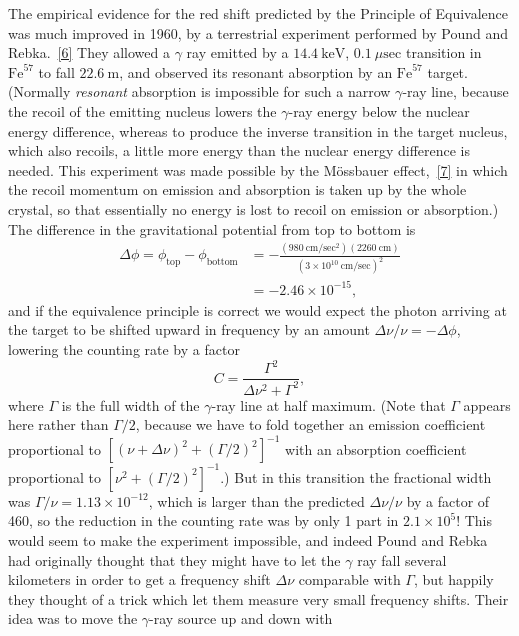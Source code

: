 The empirical evidence for the red shift predicted by the Principle of
Equivalence was much improved in 1960, by a terrestrial experiment performed
by Pound and Rebka.~\hyperref[ch3-ref-6]{[6]} They allowed a $\gamma$ ray
emitted by a $14.4\ \mathrm{keV}$, $0.1\ \mu\mathrm{sec}$ transition in
$\mathrm{Fe}^{57}$ to fall $22.6\ \mathrm m$, and observed its resonant
absorption by an $\mathrm{Fe}^{57}$ target. (Normally \emph{resonant}
absorption is impossible for such a narrow $\gamma$-ray line, because the
recoil of the emitting nucleus lowers the $\gamma$-ray energy below the
nuclear energy difference, whereas to produce the inverse transition in the
target nucleus, which also recoils, a little more energy than the nuclear
energy difference is needed. This experiment was made possible by the
M\"ossbauer effect,~\hyperref[ch3-ref-7]{[7]} in which the recoil momentum on
emission and absorption is taken up by the whole crystal, so that essentially
no energy is lost to recoil on emission or absorption.) The difference in
the gravitational potential from top to bottom is
\begin{align*}
  \Delta\phi
  =\phi_{\mathrm{top}}-\phi_{\mathrm{bottom}}
  &=-\frac{(980\ \mathrm{cm/sec^2})(2260\ \mathrm{cm})}
  {(3\times10^{10}\ \mathrm{cm/sec})^2}
  \\
  &=-2.46\times10^{-15},
\end{align*}
and if the equivalence principle is correct we would expect the photon
arriving at the target to be shifted upward in frequency by an amount
$\Delta\nu/\nu=-\Delta\phi$, lowering the counting rate by a factor
\[
  C=\frac{\Gamma^2}{\Delta\nu^2+\Gamma^2},
\]
where $\Gamma$ is the full width of the $\gamma$-ray line at half maximum.
(Note that $\Gamma$ appears here rather than $\Gamma/2$, because we have to
fold together an emission coefficient proportional to
$[(\nu+\Delta\nu)^2+(\Gamma/2)^2]^{-1}$ with an absorption coefficient
proportional to $[\nu^2+(\Gamma/2)^2]^{-1}$.) But in this transition the
fractional width was $\Gamma/\nu=1.13\times10^{-12}$, which is larger than
the predicted $\Delta\nu/\nu$ by a factor of 460, so the reduction in the
counting rate was by only 1 part in $2.1\times10^5$! This would seem to make
the experiment impossible, and indeed Pound and Rebka had originally
thought that they might have to let the $\gamma$ ray fall several kilometers
in order to get a frequency shift $\Delta\nu$ comparable with $\Gamma$, but
happily they thought of a trick which let them measure very small frequency
shifts. Their idea was to move the $\gamma$-ray source up and down with
